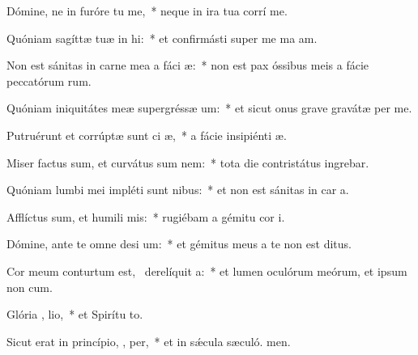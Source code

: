 \item Dómine, ne in furóre tu  me,~* neque in ira tua corrí me.
\item Quóniam sagíttæ tuæ in  hi:~* et confirmásti super me ma am.
\item Non est sánitas in carne mea a fáci  æ:~* non est pax óssibus meis a fácie peccatórum rum.
\item Quóniam iniquitátes meæ supergréssæ   um:~* et sicut onus grave gravátæ  per me.
\item Putruérunt et corrúptæ sunt ci æ,~* a fácie insipiénti æ.
\item Miser factus sum, et curvátus sum   nem:~* tota die contristátus ingrebar.
\item Quóniam lumbi mei impléti sunt nibus:~* et non est sánitas in car a.
\item Afflíctus sum, et humili  mis:~* rugiébam a gémitu cor i.
\item Dómine, ante te omne desi um:~* et gémitus meus a te non est ditus.
\item Cor meum conturtum est,~\pscross{} derelíquit   a:~* et lumen oculórum meórum, et ipsum non  cum.
\item Glória ,  lio,~* et Spirítu to.
\item Sicut erat in princípio,  ,  per,~* et in sǽcula sæculó. men.
